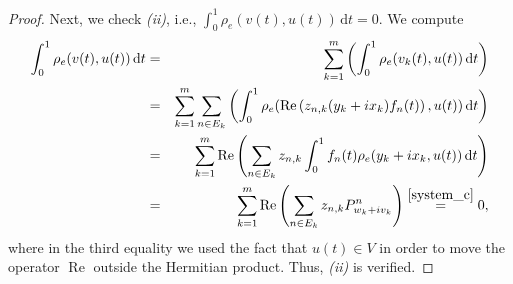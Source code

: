 \documentclass[a4paper,11pt,reqno]{amsart}
\theoremstyle{plain}
\theoremstyle{definition}
\newcommand{\re}{\operatorname{Re}}
\newcommand{\id}{e}
\newcommand{\de}{\mathrm{d}}
\begin{document}
\begin{proof}
Next, we check \emph{(ii)}, i.e., $\int^1_0 \rho_\id(v(t),u(t))\, \de t =0$. We compute
\begin{eqnarray*}
 \int^1_0 \rho_\id(v(t),u(t))\, \de t &=& \sum_{k=1}^m \left(\int^1_0 \rho_\id(v_k(t),u(t))\, \de t \right) \\ &=& \sum_{k=1}^m \sum_{n \in E_k} \left(\int^1_0 \rho_\id(\re\left(z_{n,k}(y_k+ix_k)f_n(t)\right),u(t))\, \de t \right) \\ &=& \sum_{k=1}^m \re\left(\sum_{n \in E_k} z_{n,k} \int^1_0 f_n(t)\rho_\id(y_k+ix_k,u(t))\, \de t \right) \\ &=& \sum_{k=1}^m \re\left(\sum_{n \in E_k} z_{n,k} P^n_{w_k + iv_k}\right) \stackrel{\eqref{system_c}}{=} 0,
\end{eqnarray*}
where in the third equality we used the fact that $u(t) \in V$ in order to move the operator $\re$ outside the Hermitian product. Thus, \emph{(ii)} is verified.


\end{proof}
\end{document}
